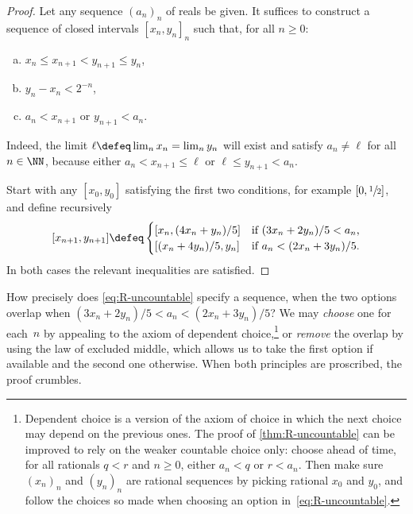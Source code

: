 \begin{proof}
  Let any sequence $(a_n)_n$ of reals be given.
  It suffices to construct a sequence of closed intervals $[x_n, y_n]_n$ such that, for all $n \geq 0$:
  \begin{enumerate}[a)]
  \item $x_n \leq x_{n+1} < y_{n+1} \leq y_n$,
  \item\label{it:width-converge} $y_n - x_n < 2^{-n}$,
  \item $a_n < x_{n+1}$ or $y_{n+1} < a_n$.
  \end{enumerate}
  Indeed, the limit $\ell \defeq \lim_n x_n = \lim_n y_n$ will exist and satisfy $a_n \neq \ell$ for all $n \in \NN$, because either $a_n < x_{n+1} \leq \ell$ or $\ell \leq y_{n+1} < a_n$.

  Start with any $[x_0, y_0]$ satisfying the first two conditions, for example $[0, \sfrac{1}{2}]$, and define recursively
  \begin{equation}
    \label{eq:R-uncountable}%
    [x_{n+1}, y_{n+1}] \defeq
    \begin{cases}
      [x_n, (4 x_n + y_n)/5] &\text{if $(3 x_n + 2 y_n)/5< a_n$,}\\
      [(x_n + 4 y_n)/5, y_n] &\text{if $a_n < (2 x_n + 3 y_n)/5$}.
    \end{cases}
  \end{equation}
  In both cases the relevant inequalities are satisfied.
\end{proof}

How precisely does \eqref{eq:R-uncountable} specify a sequence, when the two options overlap when $(3 x_n + 2 y_n)/5 < a_n < (2 x_n + 3 y_n)/5$?
%
We may \emph{choose} one for each~$n$ by appealing to the axiom of dependent choice,\footnote{Dependent choice is a version of the axiom of choice in which the next choice may depend on the previous ones. The proof of \cref{thm:R-uncountable} can be improved to rely on the weaker countable choice only: choose ahead of time, for all rationals $q < r$ and $n \geq 0$, either $a_n < q$ or $r < a_n$. Then make sure $(x_n)_n$ and $(y_n)_n$ are rational sequences by picking rational $x_0$ and $y_0$, and follow the choices so made when choosing an option in~\eqref{eq:R-uncountable}.} or \emph{remove} the overlap by using the law of excluded middle, which allows us to take the first option if available and the second one otherwise. When both principles are proscribed, the proof crumbles.

